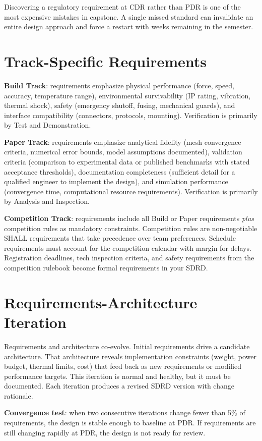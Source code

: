 Discovering a regulatory requirement at CDR rather than PDR is one of the most expensive mistakes in capstone. A single missed standard can invalidate an entire design approach and force a restart with weeks remaining in the semester.

\section{Track-Specific Requirements}

\textbf{Build Track}: requirements emphasize physical performance (force, speed, accuracy, temperature range), environmental survivability (IP rating, vibration, thermal shock), safety (emergency shutoff, fusing, mechanical guards), and interface compatibility (connectors, protocols, mounting). Verification is primarily by Test and Demonstration.

\textbf{Paper Track}: requirements emphasize analytical fidelity (mesh convergence criteria, numerical error bounds, model assumptions documented), validation criteria (comparison to experimental data or published benchmarks with stated acceptance thresholds), documentation completeness (sufficient detail for a qualified engineer to implement the design), and simulation performance (convergence time, computational resource requirements). Verification is primarily by Analysis and Inspection.

\textbf{Competition Track}: requirements include all Build or Paper requirements \emph{plus} competition rules as mandatory constraints. Competition rules are non-negotiable SHALL requirements that take precedence over team preferences. Schedule requirements must account for the competition calendar with margin for delays. Registration deadlines, tech inspection criteria, and safety requirements from the competition rulebook become formal requirements in your SDRD.

\section{Requirements-Architecture Iteration}
Requirements and architecture co-evolve. Initial requirements drive a candidate architecture. That architecture reveals implementation constraints (weight, power budget, thermal limits, cost) that feed back as new requirements or modified performance targets. This iteration is normal and healthy, but it must be documented. Each iteration produces a revised SDRD version with change rationale.

\textbf{Convergence test}: when two consecutive iterations change fewer than 5\% of requirements, the design is stable enough to baseline at PDR. If requirements are still changing rapidly at PDR, the design is not ready for review.

